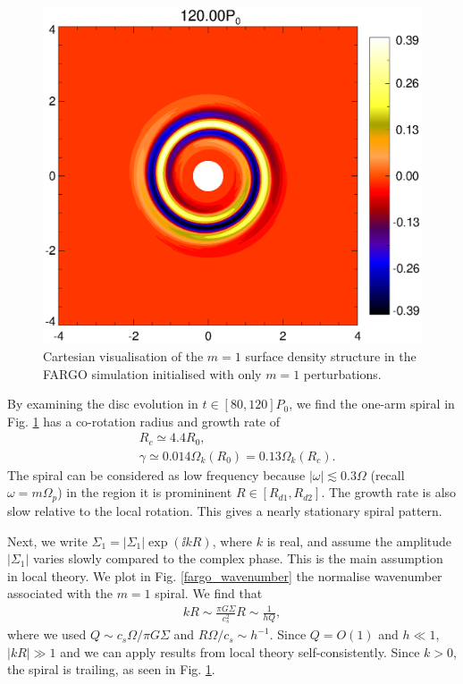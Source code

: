 \begin{figure}
  \includegraphics[width=\linewidth]{figures/polarxy2_dens120_fargo.ps}
  \caption{Cartesian visualisation of the $m=1$ surface density
    structure in the FARGO simulation initialised with only $m=1$
    perturbations. 
    \label{2d_fargo_viz}} 
\end{figure}   

By examining the disc evolution in $t\in[80,120]P_0$, we find the
one-arm spiral in Fig. \ref{2d_fargo_viz} has a 
co-rotation radius and growth rate of
\begin{align*}
  &R_c \simeq 4.4R_0,\\
  &\gamma\simeq 0.014\Omega_k(R_0) = 0.13\Omega_k(R_c). 
\end{align*}
The spiral can be considered as low frequency because $|\omega|
\lesssim 0.3\Omega$ (recall $\omega = 
m\Omega_p$) in the region it is promininent $R\in[R_{d1},R_{d2}]$. The
growth rate is also slow relative to the local rotation. This gives a
nearly stationary spiral pattern.   


Next, we write $\Sigma_1 = 
|\Sigma_1|\exp{(\ii kR)}$, where $k$ is real, and assume the amplitude
$|\Sigma_1|$ varies slowly compared to the complex phase. This is the
main assumption in local theory. We plot in
Fig. \ref{fargo_wavenumber} the normalise wavenumber associated with
the $m=1$ spiral. We find that
\begin{align*}
  kR \sim \frac{\pi G \Sigma}{c_s^2}R \sim \frac{1}{hQ}, 
\end{align*}
where we used $Q\sim c_s\Omega/\pi G \Sigma$ and $R\Omega/c_s\sim
h^{-1}$. Since $Q=O(1)$ and $h\ll 1$, $|kR|\gg 1$ and we 
can apply results from local theory self-consistently. Since $k>0$,
the spiral is trailing, as seen in Fig. \ref{2d_fargo_viz}. 


